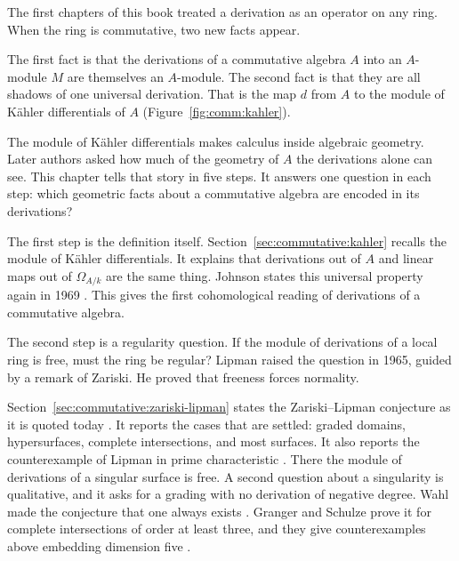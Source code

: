 
The first chapters of this book treated a derivation as an operator on any
ring. When the ring is commutative, two new facts appear.

The first fact is that the derivations of a commutative algebra $A$ into an
$A$-module $M$ are themselves an $A$-module. The second fact is that they are
all shadows of one universal derivation. That is the map $d$ from $A$ to the
module of Kähler differentials of $A$
(Figure~\ref{fig:comm:kahler}).

The module of Kähler differentials makes calculus inside algebraic geometry.
Later authors asked how much of the geometry of $A$ the derivations alone can
see. This chapter tells that story in five steps. It answers one question in
each step: which geometric facts about a commutative algebra are encoded in
its derivations?


The first step is the definition itself.
Section~\ref{sec:commutative:kahler} recalls the module of Kähler
differentials. It explains that derivations out of $A$ and linear maps out of
$\Omega_{A/k}$ are the same thing. Johnson states this universal property
again in 1969 \cite[p.~92]{Johnson1969Kahler}. This gives the first
cohomological reading of derivations of a commutative algebra.

The second step is a regularity question. If the module of derivations of a
local ring is free, must the ring be regular? Lipman raised the question in
1965, guided by a remark of Zariski. He proved that freeness forces
normality.

Section~\ref{sec:commutative:zariski-lipman} states the Zariski--Lipman
conjecture as it is quoted today \cite[Conjecture~1.1,
p.~270]{BiswasGurjarKolte2014}. It reports the cases that are settled: graded
domains, hypersurfaces, complete intersections, and most surfaces. It also
reports the counterexample of Lipman in prime characteristic
\cite[p.~116]{Graf2022LZPosChar}. There the module of derivations of a
singular surface is free. A second question about a singularity is
qualitative, and it asks for a grading with no derivation of negative
degree. Wahl made the conjecture that one always exists
\cite[Conjecture, p.~2]{GrangerSchulze2014Negative}. Granger and Schulze
prove it for complete intersections of order at least three, and
they give counterexamples above embedding dimension five
\cite[Theorems~1.1 and 1.3, p.~2]{GrangerSchulze2014Negative}.

